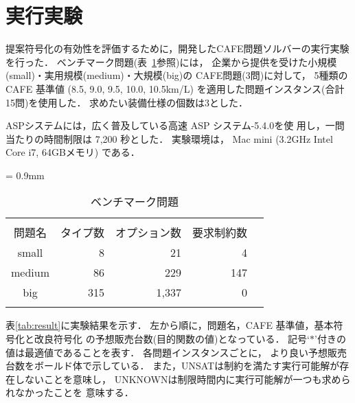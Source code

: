 \section{実行実験}





提案符号化の有効性を評価するために，開発したCAFE問題ソルバーの実行実験
を行った．
ベンチマーク問題(表~\ref{tab:bench}参照)には，
企業から提供を受けた小規模(small)・実用規模(medium)・大規模(big)の
CAFE問題(3問)に対して，
5種類の CAFE 基準値 (8.5, 9.0, 9.5, 10.0, 10.5km/L)
を適用した問題インスタンス(合計15問)を使用した．
求めたい装備仕様の個数は3とした．

ASPシステムには，広く普及している高速 ASP システム{\clingo}-5.4.0を使
用し，一問当たりの時間制限は 7,200 秒とした．
実験環境は，
Mac mini (3.2GHz Intel Core i7, 64GBメモリ)
である．

\begin{table}[tb]
  \caption{ベンチマーク問題}
  \centering
  \tabcolsep = 0.9mm
  \begin{tabular}{crrrr}
    & & & \\\bhline
    問題名 & タイプ数	& オプション数	& 要求制約数 	\\\hline
    small	    & 8		& 21	& 4	  	        \\
    medium    & 86	& 229	& 147	  	        \\
    big	    & 315	& 1,337	& 0	          	\\\hline
    & & & \\
  \end{tabular}
 \label{tab:bench}
\end{table}

表\ref{tab:result}に実験結果を示す．
左から順に，問題名，CAFE 基準値，基本符号化と改良符号化
の予想販売台数(目的関数の値)となっている．
記号`$\ast$'付きの値は最適値であることを表す．
各問題インスタンスごとに，
より良い予想販売台数をボールド体で示している．
また，\textsf{UNSAT}は制約を満たす実行可能解が存在しないことを意味し，
\textsf{UNKNOWN}は制限時間内に実行可能解が一つも求められなかったことを
意味する．

